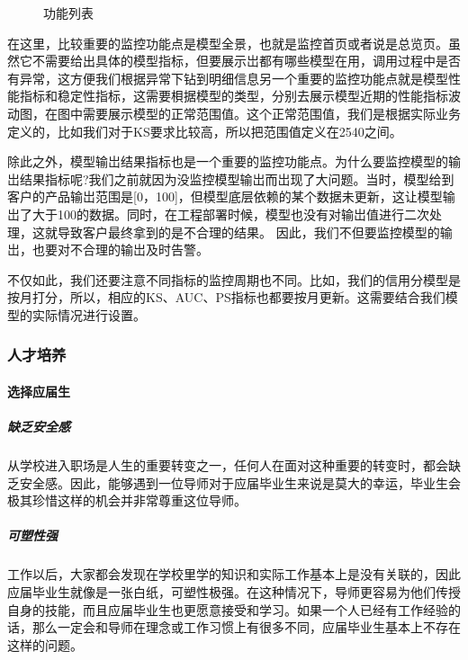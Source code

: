 \documentclass[letterpaper,10pt,english]{sphinxmanual}
\begin{document}
\begin{figure}[H]
\centering
\capstart

\noindent{}
\caption{功能列表}\label{\detokenize{chapter_AI_dive/AI_monitor_control:id2}}\end{figure}

在这里，比较重要的监控功能点是模型全景，也就是监控首页或者说是总览页。虽然它不需要给出具体的模型指标，但要展示岀都有哪些模型在用，调用过程中是否有异常，这方便我们根据异常下钻到明细信息另一个重要的监控功能点就是模型性能指标和稳定性指标，这需要梖据模型的类型，分别去展示模型近期的性能指标波动图，在图中需要展示模型的正常范围值。这个正常范围值，我们是根据实际业务定义的，比如我们对于KS要求比较高，所以把范围值定义在25\sphinxhyphen{}40之间。

除此之外，模型输岀结果指标也是一个重要的监控功能点。为什么要监控模型的输岀结果指标呢?我们之前就因为没监控模型输岀而岀现了大问题。当时，模型给到客户的产品输岀范围是{[}0，100{]}，但模型底层依赖的某个数据未更新，这让模型输岀了大于100的数据。同时，在工程部署时候，模型也没有对输岀值进行二次处理，这就导致客户最终拿到的是不合理的结果。
因此，我们不但要监控模型的输岀，也要对不合理的输岀及时告警。

不仅如此，我们还要注意不同指标的监控周期也不同。比如，我们的信用分模型是按月打分，所以，相应的KS、AUC、PS指标也都要按月更新。这需要结合我们模型的实际情况进行设置。


\subsubsection{人才培养}
\label{\detokenize{chapter_AI_dive/develop:id1}}\label{\detokenize{chapter_AI_dive/develop::doc}}

\paragraph{选择应届生}
\label{\detokenize{chapter_AI_dive/develop:id2}}

\subparagraph{缺乏安全感}
\label{\detokenize{chapter_AI_dive/develop:id3}}
从学校进入职场是人生的重要转变之一，任何人在面对这种重要的转变时，都会缺乏安全感。因此，能够遇到一位导师对于应届毕业生来说是莫大的幸运，毕业生会极其珍惜这样的机会并非常尊重这位导师。


\subparagraph{可塑性强}
\label{\detokenize{chapter_AI_dive/develop:id4}}
工作以后，大家都会发现在学校里学的知识和实际工作基本上是没有关联的，因此应届毕业生就像是一张白纸，可塑性极强。在这种情况下，导师更容易为他们传授自身的技能，而且应届毕业生也更愿意接受和学习。如果一个人已经有工作经验的话，那么一定会和导师在理念或工作习惯上有很多不同，应届毕业生基本上不存在这样的问题。
\end{document}

